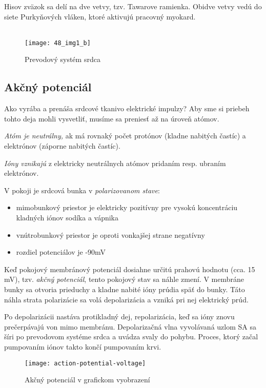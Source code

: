 \documentclass[titlepage]{article}
\begin{document}
Hisov zväzok  sa delí na dve vetvy, tzv. Tawarove ramienka. Obidve vetvy vedú do siete Purkyňových vláken, ktoré aktivujú pracovný myokard.
\\
\\

\begin{figure}[!ht]
\begin{center}
\texttt{[image: 48\_img1\_b]}
\caption{Prevodový systém srdca}
\end{center}
\end{figure}

\newpage
\subsection{Akčný potenciál}
Ako vyrába a prenáša srdcové tkanivo elektrické impulzy? Aby sme si priebeh tohto deja mohli vysvetliť, musíme sa preniesť až na úroveň atómov.

\emph{Atóm je neutrálny,} ak má rovnaký počet protónov (kladne nabitých častíc) a elektrónov (záporne nabitých častíc). 

\emph{Ióny vznikajú} z elektricky neutrálnych atómov pridaním resp. ubraním elektrónov. 

V pokoji je srdcová bunka v \emph{polarizovanom stave}:
\begin{itemize}
	\item mimobunkový priestor je elektricky pozitívny pre vysokú koncentráciu kladných iónov sodíka a vápnika
	\item vnútrobunkový priestor je oproti vonkajšej strane negatívny
	\item rozdiel potenciálov je -90mV
\end{itemize}

Keď pokojový membránový potenciál dosiahne určitú prahovú hodnotu (cca. 15 mV), tzv. \emph{akčný potenciál}, tento pokojový stav sa náhle zmení. V membráne bunky sa otvoria prieduchy a kladne nabité ióny prúdia späť do bunky. Táto náhla strata polarizácie sa volá depolarizácia a vzniká pri nej elektrický prúd.

Po depolarizácii nastáva protikladný dej, repolarizácia, keď sa ióny znovu prečerpávajú von mimo membránu. Depolarizačná vlna vyvolávaná uzlom SA sa šíri po prevodovom systéme srdca a uvádza svaly do pohybu. Proces, ktorý začal pumpovaním iónov takto končí pumpovaním krvi. 

\begin{figure}[!ht]
\begin{center}
\texttt{[image: action-potential-voltage]}
\caption{Akčný potenciál v grafickom vyobrazení}
\end{center}
\end{figure}
\end{document}
